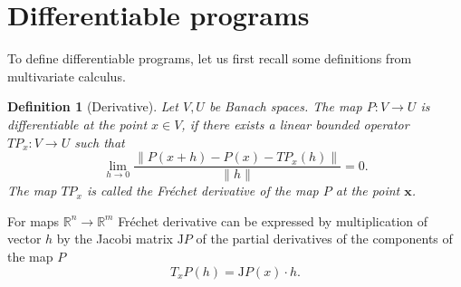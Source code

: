 \documentclass[smallcondensed]{svjour3}
\newcommand{\RR}{\mathbb{R}}
\newcommand{\x}{\mathbf{x}}
\newtheorem{definicija}{Definition}[section]
\begin{document}
\section{Differentiable programs}
To define differentiable programs, let us first recall some
definitions from multivariate calculus.
\begin{definicija}[Derivative]
  Let $V,U$ be Banach spaces. The map $P:V\to U$ is differentiable at the point
  $x\in V$, if there exists a linear bounded operator $TP_x:V\to U$ such that
  \begin{equation}
    \label{eq:frechet}
    \lim_{h\to 0}\frac{\|P(x+h)-P(x)-TP_x(h)\|}{\|h\|} = 0.
  \end{equation}
  The map $TP_x$ is called the \emph{Fréchet derivative} of the map $P$ at the
  point $\x$.
\end{definicija}
For maps $\RR^n\to \RR^m$ Fréchet derivative can be expressed by multiplication
of vector $h$ by the Jacobi matrix $\mathrm{J} P$ of the  partial derivatives of the 
components of the map $P$
\begin{equation*}
  T_xP(h) = \mathrm{J} P(x)\cdot h.
\end{equation*}
\end{document}
